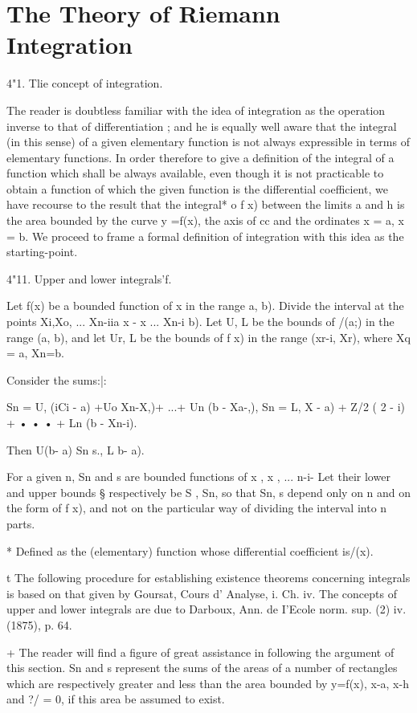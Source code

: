 \chapter{The Theory of Riemann Integration} 

4"1. Tlie concept of integration.

The reader is doubtless familiar with the idea of integration as the
operation inverse to that of differentiation ; and he is equally well
aware that the integral (in this sense) of a given elementary function
is not always expressible in terms of elementary functions. In order
therefore to give a definition of the integral of a function which
shall be always available, even though it is not practicable to obtain
a function of which the given function is the differential
coefficient, we have recourse to the result that the integral* o f x)
between the limits a and h is the area bounded by the curve y =f(x),
the axis of cc and the ordinates x = a, x = b. We proceed to frame a
formal definition of integration with this idea as the starting-point.

4"11. Upper and lower integrals'f.

Let f(x) be a bounded function of x in the range a, b). Divide the
interval at the points Xi,Xo, ... Xn-iia x - x ... Xn-i b). Let U, L
be the bounds of /(a;) in the range (a, b), and let Ur, L be the
bounds of f x) in the range (xr-i, Xr), where Xq = a, Xn=b.

Consider the sums:|:

Sn = U, (iCi - a) +Uo Xn-X,)+ ...+ Un (b - Xa-,), Sn = L, X - a) + Z/2
( 2 - i) + • • • + Ln (b - Xn-i).

Then U(b- a) Sn s., L b- a).

For a given n, Sn and s are bounded functions of x , x , ... n-i- Let
their lower and upper bounds § respectively be S , Sn, so that Sn, s
depend only on n and on the form of f x), and not on the particular
way of dividing the interval into n parts.

* Defined as the (elementary) function whose differential coefficient
is/(x).

t The following procedure for establishing existence theorems
concerning integrals is based on that given by Goursat, Cours d'
Analyse, i. Ch. iv. The concepts of upper and lower integrals are due
to Darboux, Ann. de I'Ecole norm. sup. (2) iv. (1875), p. 64.

+ The reader will find a figure of great assistance in following the
argument of this section. Sn and s represent the sums of the areas of
a number of rectangles which are respectively greater and less than
the area bounded by y=f(x), x-a, x-h and ?/ = 0, if this area be
assumed to exist.

